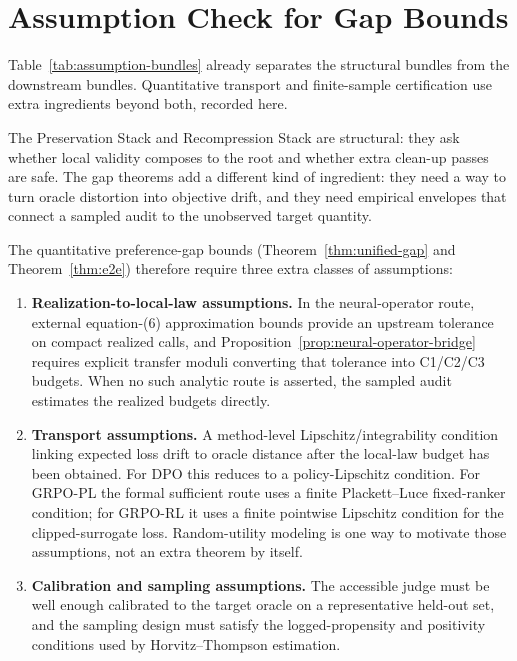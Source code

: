 \section{Assumption Check for Gap Bounds}\label{sec:verification}

Table~\ref{tab:assumption-bundles} already separates the structural bundles from the downstream bundles. Quantitative transport and finite-sample certification use extra ingredients beyond both, recorded here.

The Preservation Stack and Recompression Stack are structural: they ask whether local validity composes to the root and whether extra clean-up passes are safe. The gap theorems add a different kind of ingredient: they need a way to turn oracle distortion into objective drift, and they need empirical envelopes that connect a sampled audit to the unobserved target quantity.

The quantitative preference-gap bounds (Theorem~\ref{thm:unified-gap} and Theorem~\ref{thm:e2e}) therefore require three extra classes of assumptions:
\begin{enumerate}[leftmargin=1.5em]
    \item \textbf{Realization-to-local-law assumptions.} In the neural-operator route, external equation-(6) approximation bounds provide an upstream tolerance on compact realized calls, and Proposition~\ref{prop:neural-operator-bridge} requires explicit transfer moduli converting that tolerance into C1/C2/C3 budgets. When no such analytic route is asserted, the sampled audit estimates the realized budgets directly.
    \item \textbf{Transport assumptions.} A method-level Lipschitz/integrability condition linking expected loss drift to oracle distance after the local-law budget has been obtained. For DPO this reduces to a policy-Lipschitz condition. For GRPO-PL the formal sufficient route uses a finite Plackett--Luce fixed-ranker condition; for GRPO-RL it uses a finite pointwise Lipschitz condition for the clipped-surrogate loss. Random-utility modeling \citep{Schervish1995} is one way to motivate those assumptions, not an extra theorem by itself.
    \item \textbf{Calibration and sampling assumptions.} The accessible judge must be well enough calibrated to the target oracle on a representative held-out set, and the sampling design must satisfy the logged-propensity and positivity conditions used by Horvitz--Thompson estimation.
\end{enumerate}

